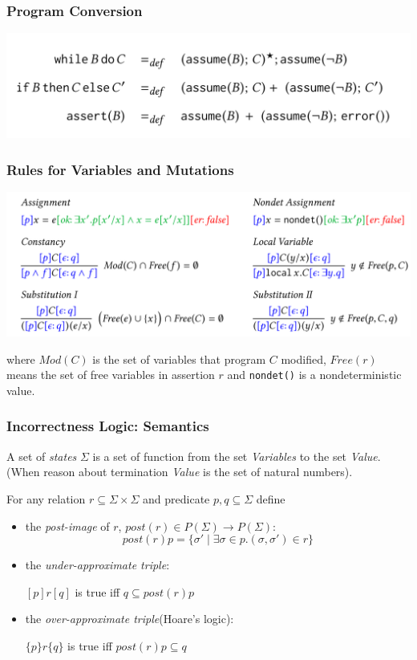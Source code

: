 \documentclass[11pt]{beamer}
\begin{document}
\begin{frame}\frametitle{Program Conversion}
\begin{center}
\includegraphics[scale = 0.30]{7.PNG}

\end{center}

\end{frame}
\begin{frame}\frametitle{Rules for Variables and Mutations}
\begin{center}
\includegraphics[scale = 0.30]{8.PNG}

\end{center}
where $Mod(C)$ is the set of variables that program $C$ modified, $Free(r)$ means the set of free variables in assertion $r$ and \texttt{nondet()} is a nondeterministic value.
\end{frame}
\begin{frame}\frametitle{Incorrectness Logic: Semantics}
A set of \textit{states} $\Sigma$ is a set of function from the set \textit{Variables} to the set \textit{Value}.(When reason about termination \textit{Value} is the set of natural numbers).

\begin{definition}
For any relation $r\subseteq \Sigma \times \Sigma$ and predicate $p,q\subseteq \Sigma$ define
\begin{itemize}

\item the \textit{post-image} of $r$, $post(r)\in P(\Sigma)\rightarrow P(\Sigma)$:
\[post(r)p = \{\sigma'\mid \exists \sigma \in p. (\sigma, \sigma')\in r\}\]
\item the \textit{under-approximate triple}:

$[p]r[q]$ is true iff $q\subseteq post(r)p$

\item the \textit{over-approximate triple}(Hoare's logic):

$\{p\}r\{q\}$ is true iff $post(r)p \subseteq q$
\end{itemize}


\end{definition}



\end{frame}
\end{document}
